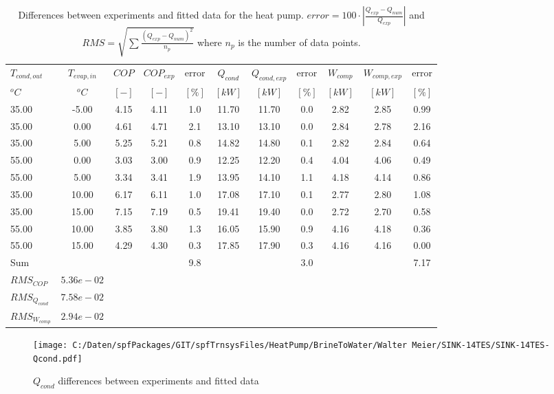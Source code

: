 \documentclass[english]{SPFShortReport}
\begin{document}
\begin{table}[!ht]
\begin{small}
\caption{Differences between experiments and fitted data for the heat pump.          $error=100 \cdot |\frac{Q_{exp}-Q_{num}}{Q_{exp}}|$ and $RMS = \sqrt { \sum{\frac{(Q_{exp}-Q_{num})^2}{n_p}} }$ where $n_p$ is the number of data points.}
\begin{center}
\resizebox{12cm}{!} 
{
\begin{tabular}{l | c c c c c c c c c c } 
\hline
\hline
$T_{cond,out}$ &$T_{evap,in}$ &$COP$ &$COP_{exp}$ &error &$Q_{cond}$ &$Q_{cond,exp}$ &error &$W_{comp}$ &$W_{comp,exp}$ &error \\ 
$^oC$ &$^oC$ &$[-]$ &$[-]$ &$[\%]$ &$[kW]$ &$[kW]$ &$[\%]$ &$[kW]$ &$[kW]$ &$[\%]$\\ 
\hline
35.00  & -5.00 & 4.15 & 4.11 & 1.0 & 11.70 & 11.70 & 0.0 & 2.82 & 2.85 & 0.99\\ 
35.00  & 0.00 & 4.61 & 4.71 & 2.1 & 13.10 & 13.10 & 0.0 & 2.84 & 2.78 & 2.16\\ 
35.00  & 5.00 & 5.25 & 5.21 & 0.8 & 14.82 & 14.80 & 0.1 & 2.82 & 2.84 & 0.64\\ 
55.00  & 0.00 & 3.03 & 3.00 & 0.9 & 12.25 & 12.20 & 0.4 & 4.04 & 4.06 & 0.49\\ 
55.00  & 5.00 & 3.34 & 3.41 & 1.9 & 13.95 & 14.10 & 1.1 & 4.18 & 4.14 & 0.86\\ 
35.00  & 10.00 & 6.17 & 6.11 & 1.0 & 17.08 & 17.10 & 0.1 & 2.77 & 2.80 & 1.08\\ 
35.00  & 15.00 & 7.15 & 7.19 & 0.5 & 19.41 & 19.40 & 0.0 & 2.72 & 2.70 & 0.58\\ 
55.00  & 10.00 & 3.85 & 3.80 & 1.3 & 16.05 & 15.90 & 0.9 & 4.16 & 4.18 & 0.36\\ 
55.00  & 15.00 & 4.29 & 4.30 & 0.3 & 17.85 & 17.90 & 0.3 & 4.16 & 4.16 & 0.00\\ 
\hline 
 Sum &  & &  & 9.8 &  &  & 3.0 & &  & 7.17\\ 
\hline 
 $RMS_{COP}$ & $5.36e-02$ \\ 
 $RMS_{Q_{cond}}$ & $7.58e-02$ \\ 
 $RMS_{W_{comp}}$ & $2.94e-02$ \\ 
\hline
\hline
\end{tabular}
}
\label{ErrorsTable}
\end{center}
\end{small}
\end{table}
\begin{figure}[!ht]
\begin{center}
\texttt{[image: C:/Daten/spfPackages/GIT/spfTrnsysFiles/HeatPump/BrineToWater/Walter Meier/SINK-14TES/SINK-14TES-Qcond.pdf]}
\caption{$Q_{cond}$ differences between experiments and fitted data}
\label{QcongFig}
\end{center}
\end{figure}
\end{document}

